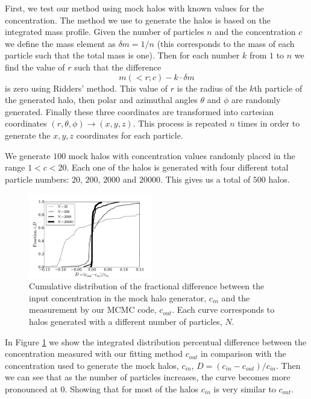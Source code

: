 \documentclass[useAMS,usenatbib]{mn2e}
\begin{document}
First, we test our method using mock halos with known values for the
concentration. The method we use to generate the halos is based on the integrated
mass profile. Given the number of particles $n$ and the concentration
$c$ we define the mass element as $\delta m = 1/n$ (this corresponds
to the mass of each particle such that the total mass is one). Then
for each number $k$ from $1$ to $n$ we find the value of $r$ such that
the difference
%
\begin{equation}
m(<r;c)-k \cdot \delta m
\end{equation}
%
is zero using Ridders' method. This value of $r$ is the radius of
the $k$th particle of the generated halo, then polar and azimuthal
angles $\theta$ and $\phi$ are randomly generated. Finally these three
coordinates are transformed into cartesian coordinates
$(r,\theta,\phi) \rightarrow (x,y,z)$. This process is repeated $n$
times in order to generate the $x,y,z$ coordinates for each particle.



We generate $100$ mock halos with concentration values randomly
placed in the range $1<c<20$. Each one of the halos is generated with
four different total particle numbers: $20$, $200$, $2000$ and
$20000$. This gives us a total of $500$ halos.


\begin{figure}
\begin{center}
  \includegraphics[width=0.48\textwidth]{percentual_diff.pdf}
\end{center}
\caption{Cumulative distribution of the fractional difference between
  the input concentration in the mock halo generator, $c_{in}$ and the
  measurement by our MCMC code, $c_{out}$. Each curve corresponds to
  halos generated with a different number of particles, $N$.
    \label{fig:results_mocks}}
\end{figure}


In Figure \ref{fig:results_mocks} we show the integrated distribution
percentual difference between the concentration measured with our
fitting method $c_{out}$ in comparison with the concentration used to
generate the mock halos, $c_{in}$, $D=(c_{in}-c_{out})/c_{in}$. Then we can see that as the number of particles increases, the curve becomes more pronounced at 0. Showing that for most of the halos $c_{in}$ is very similar to $c_{out}$.
\end{document}
